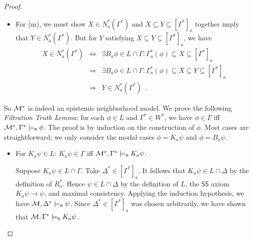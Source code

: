 \documentclass[12pt]{article}
\theoremstyle{definition}
\newcommand{\M}{{\cal M}}      %
\newcommand{\modelsn}{\models_{\mathsf{n}}}                  %
\begin{document}
\begin{proof}
\begin{itemize}
  \item For (m), we must show $X\in N_a^*(\Gamma^*)$ and $X\subseteq
    Y\subseteq[\Gamma^*]_a$ together imply that $Y\in
    N^*_a(\Gamma^*)$. But for $Y$ satisfying $X\subseteq
    Y\subseteq[\Gamma^*]_a$, we have
    \[
    \renewcommand{\arraystretch}{1.3}
    \begin{array}{lcl}
      X\in N^*_a(\Gamma^*) 
      & \Leftrightarrow &
      \exists B_a\phi\in L\cap\Gamma:
      \Gamma^*_a(\phi)\subseteq X\subseteq[\Gamma^*]_a
      \\
      & \Rightarrow &
      \exists B_a\phi\in L\cap\Gamma:
      \Gamma^*_a(\phi)\subseteq X\subseteq Y\subseteq[\Gamma^*]_a
      \\
      & \Rightarrow &
      Y\in N^*_a(\Gamma^*)
      \enspace.
    \end{array}
    \]
  \end{itemize}
  So $\M^*$ is indeed an epistemic neighborhood model.  We prove the
  following \emph{Filtration Truth Lemma\/}: for each $\phi\in L$ and
  $\Gamma^*\in W^*$, we have $\phi\in\Gamma$ iff
  $\M^*,\Gamma^*\modelsn\phi$. The proof is by induction on the
  construction of $\phi$.  Most cases are straightforward; we only
  consider the modal cases $\phi=K_a\psi$ and $\phi=B_a\psi$.
  \begin{itemize}
  \item For $K_a\psi\in L$: $K_a\psi\in\Gamma$ iff
    $\M^*,\Gamma^*\modelsn K_a\psi$.

    Suppose $K_a\psi\in L\cap\Gamma$. Take $\Delta^*\in[\Gamma^*]_a$.
    It follows that $K_a\psi\in L\cap\Delta$ by the definition of
    $R^*_a$.  Hence $\psi\in L\cap\Delta$ by the definition of $L$,
    the $\mathsf{S5}$ axiom $K_a\psi\to\psi$, and maximal consistency.
    Applying the induction hypothesis, we have
    $\M,\Delta^*\modelsn\psi$.  Since $\Delta^*\in[\Gamma^*]_a$ was
    chosen arbitrarily, we have shown that $\M,\Gamma^*\modelsn
    K_a\psi$.


\end{itemize}
\end{proof}
\end{document}
